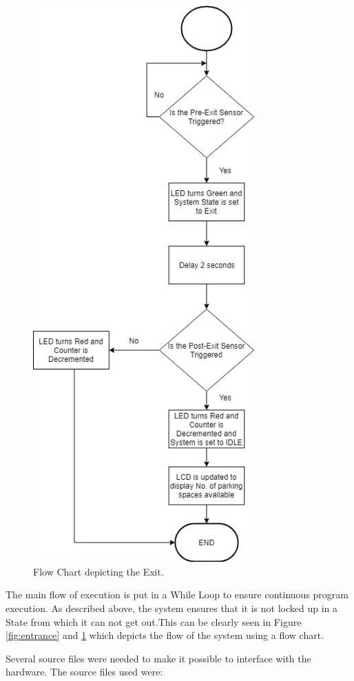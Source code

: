 \documentclass[11pt,a4paper,twocolumn]{article}
\begin{document}
\begin{figure}[b]
	\centering
	\includegraphics[width=85mm]{FlowChartExit}
	\caption{Flow Chart depicting the Exit.}
	\label{fig:exit}
	\centering
\end{figure}
The main flow of execution is put in a While Loop to ensure continuous program execution. As described above, the system ensures that it is not locked up in a State from which it can not get out.This can be clearly seen in Figure \ref{fig:entrance} and \ref{fig:exit} which depicts the flow of the system using a flow chart. 


Several source files were needed to make it possible to interface with the hardware. The source files used were:
\end{document}
